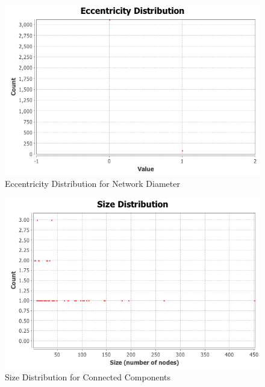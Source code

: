 \begin{figure}[ht]    
    \begin{center}
        \includegraphics[scale=0.60]{q3/NetworkDiameter/EccentricityDistribution.png}
        \caption{Eccentricity Distribution for Network Diameter}
        \label{fig:q3-12}
    \end{center}
\end{figure}
\newpage


\begin{figure}[ht]    
    \begin{center}
        \includegraphics[scale=0.60]{q3/ConnectedComponents/ccSizeDistribution.png}
        \caption{Size Distribution for Connected Components}
        \label{fig:q3-13}
    \end{center}
\end{figure}

